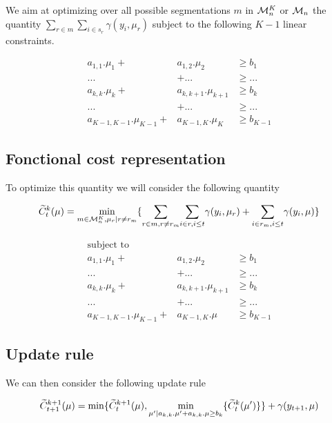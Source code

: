 \documentclass{article}
\begin{document}
We aim at optimizing over all possible segmentations $m$ in $\mathcal{M}^K_n$ or $\mathcal{M}_n$
 the quantity
$\sum_{r \in m} \sum_{i \in s_{r}} \gamma(y_i, \mu_{r})$ subject to
the following $K-1$ linear constraints. 

\begin{eqnarray*}
a_{1,1}.\mu_1 + & a_{1,2}.\mu_2  & \geq  b_1 \\
... & + ... & \geq ... \\
a_{k,k}.\mu_{k} + &a_{k,k+1}.\mu_{k+1}  & \geq  b_{k} \\
... & + ... & \geq ...  \\
a_{K-1,K-1}.\mu_{K-1} +& a_{K-1,K}.\mu_K & \geq  b_{K-1}
\end{eqnarray*}

\subsection{Fonctional cost representation}
To optimize this quantity we will consider the following quantity

\begin{equation}
\widetilde{C}^k_t(\mu) =  \underset{m \in \mathcal{M}^K_n, \mu_r |  r \neq r_m}{\min} 
		\{ 
		   \underset{r \in m, r \neq r_m}{\sum} 
		   \underset{i \in r, i \leq t  }{\sum} \gamma(y_i, \mu_{r}) 
		+ 
		   \underset{i \in r_m, i \leq t}{\sum} \gamma(y_i, \mu)
		\}  
\end{equation}

\begin{eqnarray*}
\text{subject to} \\
a_{1,1}. \mu_1 + & a_{1,2}. \mu_2  & \geq  b_1 \\
... & + ... & \geq ... \\
a_{k,k}. \mu_{k} + &a_{k,k+1}. \mu_{k+1}  & \geq  b_{k} \\
... & + ... & \geq ...  \\
a_{K-1,K-1}.\mu_{K-1} +& a_{K-1,K}. \mu & \geq  b_{K-1}
\end{eqnarray*}





\subsection{Update rule}
We can then consider the following update rule

\begin{equation}
\widetilde{C}^{k+1}_{t+1}(\mu) = \min \{ \widetilde{C}^{k+1}_{t}(\mu)  , \underset{\mu' | a_{k,k}. \mu' + a_{k,k}. \mu  \geq  b_{k}}{\min} \{ \widetilde{C}^{k}_{t}(\mu') \}  \} + \gamma(y_{t+1}, \mu)
\end{equation}
\end{document}
